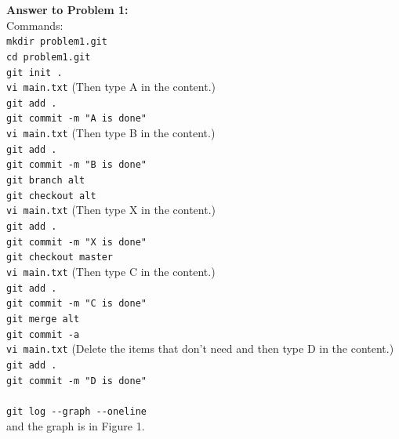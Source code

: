 \documentclass[12pt]{article}
\begin{document}
\bigskip
\noindent\textbf{Answer to Problem 1:}\\
Commands:\\
\verb+mkdir problem1.git+\\
\verb+cd problem1.git+\\
\verb+git init .+\\
\verb+vi main.txt+ (Then type A in the content.)\\
\verb+git add .+\\
\verb+git commit -m "A is done"+\\
\verb+vi main.txt+ (Then type B in the content.)\\
\verb+git add .+\\
\verb+git commit -m "B is done"+\\
\verb+git branch alt+\\
\verb+git checkout alt+\\
\verb+vi main.txt+ (Then type X in the content.)\\
\verb+git add .+\\
\verb+git commit -m "X is done"+\\
\verb+git checkout master+\\
\verb+vi main.txt+ (Then type C in the content.)\\
\verb+git add .+\\
\verb+git commit -m "C is done"+\\
\verb+git merge alt+\\
\verb+git commit -a+\\
\verb+vi main.txt+ (Delete the items that don't need and then type D in the content.)\\
\verb+git add .+\\
\verb+git commit -m "D is done"+\\


\\
\verb+git log --graph --oneline+\\
and the graph is in Figure 1.
\end{document}
